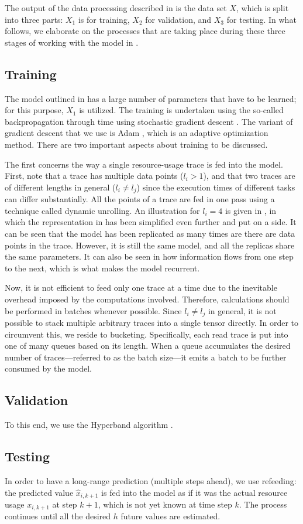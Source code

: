 The output of the data processing described in  is the data set $X$,
which is split into three parts: $X_1$ is for training, $X_2$ for validation,
and $X_3$ for testing. In what follows, we elaborate on the processes that are
taking place during these three stages of working with the model in
.

\subsection{Training}
The model outlined in  has a large number of parameters that have to
be learned; for this purpose, $X_1$ is utilized. The training is undertaken
using the so-called backpropagation through time using stochastic gradient
descent \cite{goodfellow2016}. The variant of gradient descent that we use is
Adam \cite{kingma2014}, which is an adaptive optimization method. There are two
important aspects about training to be discussed.


The first concerns the way a single resource-usage trace is fed into the model.
First, note that a trace has multiple data points ($l_i > 1$), and that two
traces are of different lengths in general ($l_i \neq l_j$) since the execution
times of different tasks can differ substantially. All the points of a trace are
fed in one pass using a technique called dynamic unrolling. An illustration for
$l_i = 4$ is given in , in which the representation in 
has been simplified even further and put on a side. It can be seen that the
model has been replicated as many times are there are data points in the trace.
However, it is still the same model, and all the replicas share the same
parameters. It can also be seen in  how information flows from one
step to the next, which is what makes the model recurrent.

Now, it is not efficient to feed only one trace at a time due to the inevitable
overhead imposed by the computations involved. Therefore, calculations should be
performed in batches whenever possible. Since $l_i \neq l_j$ in general, it is
not possible to stack multiple arbitrary traces into a single tensor directly.
In order to circumvent this, we reside to bucketing. Specifically, each read
trace is put into one of many queues based on its length. When a queue
accumulates the desired number of traces---referred to as the batch size---it
emits a batch to be further consumed by the model.

\subsection{Validation}
To this end, we use the Hyperband algorithm \cite{li2016}.

\subsection{Testing}
In order to have a long-range prediction (multiple steps ahead), we use
refeeding: the predicted value $\hat{x}_{i,k + 1}$ is fed into the model as if
it was the actual resource usage $x_{i,k + 1}$ at step $k + 1$, which is not
yet known at time step $k$. The process continues until all the desired $h$
future values are estimated.
